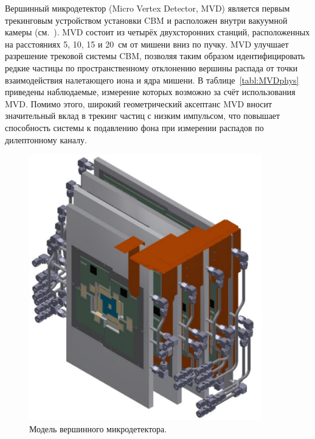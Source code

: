 \begin{minipage}[t]{0.495\textwidth}

Вершинный микродетектор (Micro Vertex Detector, MVD) является первым трекинговым устройством установки CBM и расположен внутри вакуумной камеры (см.~). MVD состоит из четырёх двухсторонних станций, расположенных на расстояниях 5, 10, 15 и 20~см от мишени вниз по пучку.
MVD улучшает разрешение трековой системы CBM, позволяя таким образом идентифицировать редкие частицы по пространственному отклонению вершины распада от точки взаимодействия налетающего иона и ядра мишени. В таблице~\ref{tabl:MVDphys} приведены наблюдаемые, измерение которых возможно за счёт использования MVD.
Помимо этого, широкий геометрический аксептанс MVD вносит значительный вклад в трекинг частиц с низким импульсом, что повышает способность системы к подавлению фона при измерении распадов по дилептонному каналу.
\end{minipage}
\begin{minipage}[t]{0.495\textwidth}
\begin{figure}[H]
\centering
\includegraphics[width=0.9\textwidth]{pictures/MVD_1.png}
\caption{Модель вершинного микродетектора.}
\label{fig:MVD1}
\end{figure}
\end{minipage}

